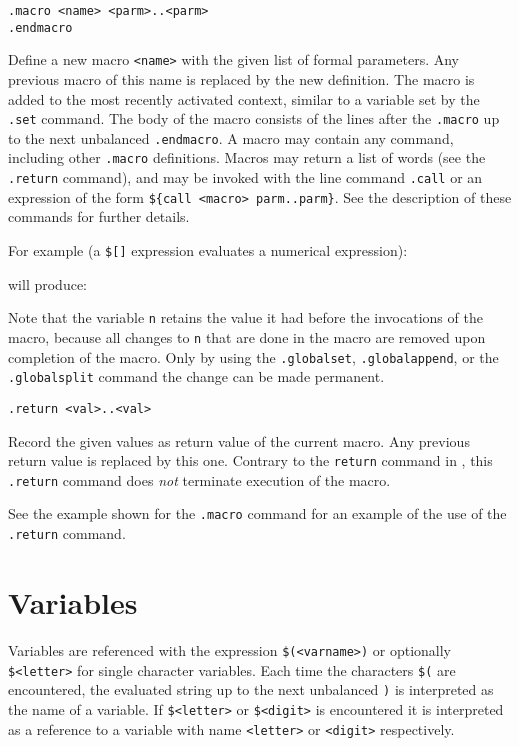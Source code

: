 \begin{verbatim}
.macro <name> <parm>..<parm>
.endmacro
\end{verbatim}
\begin{desc}
Define a new macro \verb+<name>+ with the given list of formal
parameters.  Any previous macro of this name is replaced by the new
definition.  The macro is added to the most recently activated
context, similar to a variable set by the \texttt{.set} command.
The body of the macro consists of the lines after the
\verb+.macro+ up to the next unbalanced \verb+.endmacro+.
A macro may contain any {\Tm} command, including other \verb+.macro+
definitions.
Macros may return a list of words (see the \verb+.return+ command),
and may be invoked with the line command \verb+.call+ or an expression
of the form \verb+${call <macro> parm..parm}+.  See the description
of these commands for further details.

For example (a \verb'$[]' expression evaluates a numerical expression):
\begin{showfile}

\end{showfile}
will produce:
\begin{showfile}

\end{showfile}
Note that the variable \verb'n' retains the value it had before the
invocations of the macro, because all changes to \verb'n' that are
done in the macro are removed upon completion of the macro.  Only
by using the \verb'.globalset', \verb'.globalappend', or the
\texttt{.globalsplit} command the change can be made permanent.
\end{desc}
\begin{verbatim}
.return <val>..<val>
\end{verbatim}
\begin{desc}
Record the given values as return value of the current macro.
Any previous return value is replaced by this one.
Contrary to the \texttt{return} command in {\C}, this \verb+.return+
command does \emph{not} terminate execution of the macro.

See the example shown for the \verb'.macro' command for an example of the
use of the \verb'.return' command.
\end{desc}
\section{Variables}
Variables are referenced with the expression \texttt{\$(<varname>)}
or optionally \texttt{\$<letter>} for single character variables.
Each time the characters \texttt{\$(} are encountered, the evaluated
string up to the next unbalanced \texttt{)} is interpreted as the
name of a variable.  If \texttt{\$<letter>} or \texttt{\$<digit>}
is encountered it is interpreted as a reference to a variable with
name \texttt{<letter>} or \texttt{<digit>} respectively.

